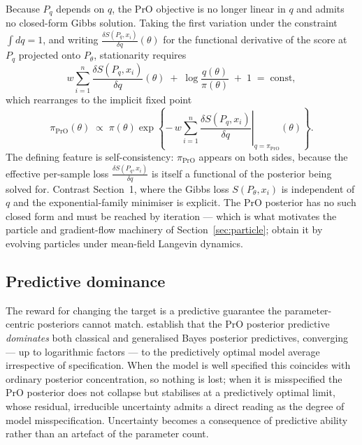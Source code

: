 \documentclass[mstat,12pt]{unswthesis}
\begin{document}
Because $P_q$ depends on $q$, the PrO objective is no longer linear in $q$ and admits no closed-form Gibbs solution. Taking the first variation under the constraint $\int dq = 1$, and writing $\tfrac{\delta S(P_q, x_i)}{\delta q}(\theta)$ for the functional derivative of the score at $P_q$ projected onto $P_\theta$, stationarity requires
$$
    w\sum_{i=1}^{n}\frac{\delta S(P_q, x_i)}{\delta q}(\theta) \;+\; \log\frac{q(\theta)}{\pi(\theta)} \;+\; 1 \;=\; \text{const},
$$
which rearranges to the implicit fixed point
$$
    \pi_{\mathrm{PrO}}(\theta) \;\propto\; \pi(\theta)\exp\!\left\{ -\,w\sum_{i=1}^{n} \left.\frac{\delta S(P_q, x_i)}{\delta q}\right|_{q=\pi_{\mathrm{PrO}}}\!\!(\theta) \right\}.
$$
The defining feature is self-consistency: $\pi_{\mathrm{PrO}}$ appears on both sides, because the effective per-sample loss $\tfrac{\delta S(P_q, x_i)}{\delta q}$ is itself a functional of the posterior being solved for. Contrast Section~1, where the Gibbs loss $S(P_\theta, x_i)$ is independent of $q$ and the exponential-family minimiser is explicit. The PrO posterior has no such closed form and must be reached by iteration --- which is what motivates the particle and gradient-flow machinery of Section~\ref{sec:particle}; \citet{mclatchie2025pro} obtain it by evolving particles under mean-field Langevin dynamics.

\subsection*{Predictive dominance}

The reward for changing the target is a predictive guarantee the parameter-centric posteriors cannot match. \citet{mclatchie2025pro} establish that the PrO posterior predictive \emph{dominates} both classical and generalised Bayes posterior predictives, converging --- up to logarithmic factors --- to the predictively optimal model average irrespective of specification.%
When the model is well specified this coincides with ordinary posterior concentration, so nothing is lost; when it is misspecified the PrO posterior does not collapse but stabilises at a predictively optimal limit, whose residual, irreducible uncertainty admits a direct reading as the degree of model misspecification. Uncertainty becomes a consequence of predictive ability rather than an artefact of the parameter count.
\end{document}
